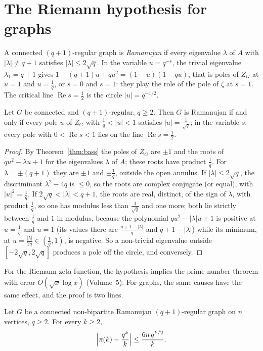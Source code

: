\section{The Riemann hypothesis for graphs}

A connected $(q+1)$-regular graph is \emph{Ramanujan} if every eigenvalue $\lambda$ of $A$ with $|\lambda|\ne q+1$ satisfies $|\lambda|\le2\sqrt q$. In the variable $u=q^{-s}$, the trivial eigenvalue $\lambda_1=q+1$ gives
$1-(q+1)u+qu^2=(1-u)(1-qu)$, that is poles of $Z_G$ at $u=1$ and $u=\frac1q$, or $s=0$ and $s=1$: they play the role of the pole of $\zeta$ at $s=1$. The critical line $\operatorname{Re}s=\frac12$ is the circle $|u|=q^{-1/2}$.

\begin{theorem}[Sunada, 1986]\label{thm:graphRH}
Let $G$ be connected and $(q+1)$-regular, $q\ge2$. Then $G$ is Ramanujan if and only if every pole $u$ of $Z_G$ with $\frac1q<|u|<1$ satisfies $|u|=\frac1{\sqrt q}$; in the variable $s$, every pole with $0<\operatorname{Re}s<1$ lies on
the line $\operatorname{Re}s=\frac12$.
\end{theorem}

\begin{proof}
By Theorem~\ref{thm:bass} the poles of $Z_G$ are $\pm1$ and the roots of $qu^2-\lambda u+1$ for the eigenvalues $\lambda$ of $A$; these roots have product $\frac1q$. For $\lambda=\pm(q+1)$ they are $\pm1$ and $\pm\frac1q$, outside the open annulus.
If $|\lambda|\le2\sqrt q$, the discriminant $\lambda^2-4q$ is $\le0$, so the roots are complex conjugate (or equal), with $|u|^2=\frac1q$. If $2\sqrt q<|\lambda|<q+1$, the roots are real, distinct, of the sign of $\lambda$, with
product $\frac1q$, so one has modulus less than $\frac1{\sqrt q}$ and one more; both lie strictly between $\frac1q$ and $1$ in modulus, because the polynomial $qu^2-|\lambda|u+1$ is positive at $u=\frac1q$ and $u=1$
(its values there are $\frac{q+1-|\lambda|}q$ and $q+1-|\lambda|$) while its minimum, at $u=\frac{|\lambda|}{2q}\in(\frac1q,1)$, is negative. So a non-trivial eigenvalue outside $[-2\sqrt q,2\sqrt q]$ produces a pole off the circle, and
conversely.
\end{proof}

For the Riemann zeta function, the hypothesis implies the prime number theorem with error $O(\sqrt x\log x)$ (Volume~5). For graphs, the same causes have the same effect, and the proof is two lines.

\begin{theorem}\label{thm:graphpnt}
Let $G$ be a connected non-bipartite Ramanujan $(q+1)$-regular graph on $n$ vertices, $q\ge2$. For every $k\ge2$,
\[
\Bigl|\pi(k)-\frac{q^k}k\Bigr|\le\frac{6n\,q^{k/2}}k.
\]
\end{theorem}

